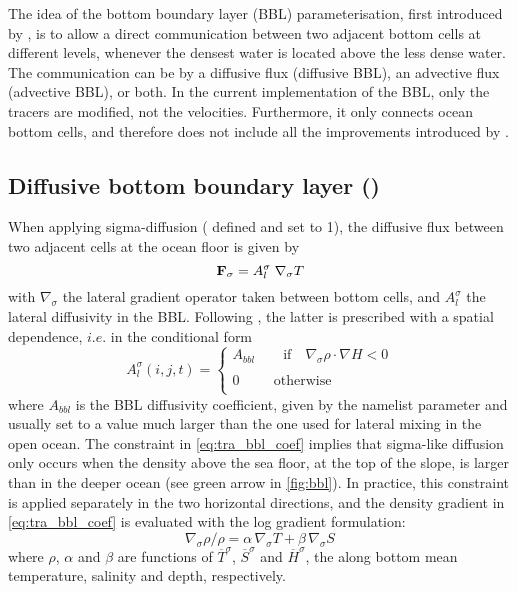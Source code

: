 \documentclass[../main/NEMO_manual]{subfiles}
\begin{document}
The idea of the bottom boundary layer (BBL) parameterisation, first introduced by \citet{Beckmann_Doscher1997},
is to allow a direct communication between two adjacent bottom cells at different levels,
whenever the densest water is located above the less dense water.
The communication can be by a diffusive flux (diffusive BBL), an advective flux (advective BBL), or both.
In the current implementation of the BBL, only the tracers are modified, not the velocities.
Furthermore, it only connects ocean bottom cells, and therefore does not include all the improvements introduced by
\citet{Campin_Goosse_Tel99}.

\subsection{Diffusive bottom boundary layer (\protect{})}
\label{subsec:TRA_bbl_diff}

When applying sigma-diffusion ( defined and  set to 1),
the diffusive flux between two adjacent cells at the ocean floor is given by 
\[
  {\rm {\bf F}}_\sigma=A_l^\sigma \; \nabla_\sigma T
\]
with $\nabla_\sigma$ the lateral gradient operator taken between bottom cells,
and  $A_l^\sigma$ the lateral diffusivity in the BBL.
Following \citet{Beckmann_Doscher1997}, the latter is prescribed with a spatial dependence,
$i.e.$ in the conditional form
\begin{equation}
  \label{eq:tra_bbl_coef}
  A_l^\sigma (i,j,t)=\left\{ {
      \begin{array}{l}
        A_{bbl}  \quad \quad   \mbox{if}  \quad   \nabla_\sigma \rho  \cdot  \nabla H<0 \\ \\
        0\quad \quad \;\,\mbox{otherwise} \\
      \end{array}}
  \right.
\end{equation} 
where $A_{bbl}$ is the BBL diffusivity coefficient, given by the namelist parameter  and
usually set to a value much larger than the one used for lateral mixing in the open ocean.
The constraint in \autoref{eq:tra_bbl_coef} implies that sigma-like diffusion only occurs when
the density above the sea floor, at the top of the slope, is larger than in the deeper ocean
(see green arrow in \autoref{fig:bbl}).
In practice, this constraint is applied separately in the two horizontal directions,
and the density gradient in \autoref{eq:tra_bbl_coef} is evaluated with the log gradient formulation: 
\[
  \nabla_\sigma \rho / \rho = \alpha \,\nabla_\sigma T + \beta   \,\nabla_\sigma S
\]
where $\rho$, $\alpha$ and $\beta$ are functions of $\overline{T}^\sigma$,
$\overline{S}^\sigma$ and $\overline{H}^\sigma$, the along bottom mean temperature, salinity and depth, respectively.
\end{document}
